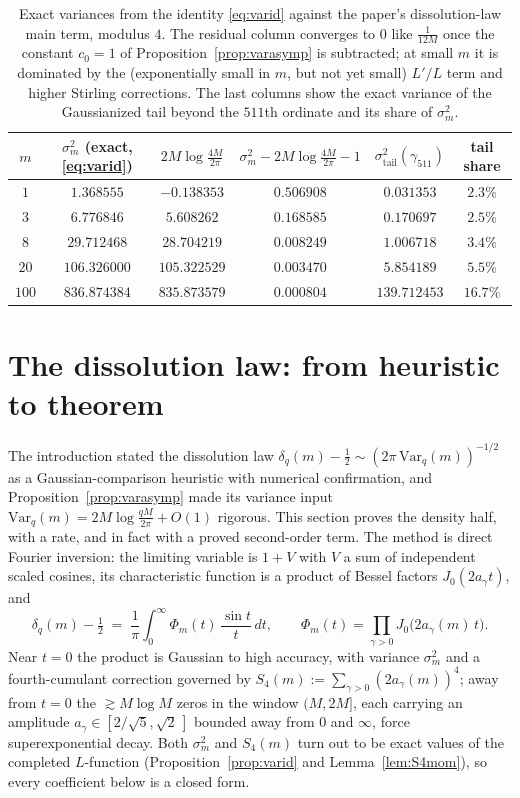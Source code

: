 \documentclass[11pt]{article}
\begin{document}
\begin{table}[h]\centering
\begin{tabular}{cccccc}
\toprule
$m$ & $\sigma_m^2$ (exact, \eqref{eq:varid}) &
$2M\log\frac{4M}{2\pi}$ &
$\sigma_m^2-2M\log\frac{4M}{2\pi}-1$ &
$\sigma^2_{\mathrm{tail}}(\gamma_{511})$ & tail share\\
\midrule
$1$   & $1.368555$   & $-0.138353$  & $0.506908$ & $0.031353$   & $2.3\%$\\
$3$   & $6.776846$   & $5.608262$   & $0.168585$ & $0.170697$   & $2.5\%$\\
$8$   & $29.712468$  & $28.704219$  & $0.008249$ & $1.006718$   & $3.4\%$\\
$20$  & $106.326000$ & $105.322529$ & $0.003470$ & $5.854189$   & $5.5\%$\\
$100$ & $836.874384$ & $835.873579$ & $0.000804$ & $139.712453$ & $16.7\%$\\
\bottomrule
\end{tabular}
\caption{Exact variances from the identity \eqref{eq:varid} against
the paper's dissolution-law main term, modulus $4$. The residual
column converges to $0$ like $\tfrac1{12M}$ once the constant $c_0=1$
of Proposition~\ref{prop:varasymp} is subtracted; at small $m$ it is
dominated by the (exponentially small in $m$, but not yet small)
$L'/L$ term and higher Stirling corrections. The last columns show the
exact variance of the Gaussianized tail beyond the $511$th ordinate
and its share of $\sigma_m^2$.}
\label{tab:varexact}
\end{table}


\section{The dissolution law: from heuristic to theorem}
\label{sec:dissolution}

The introduction stated the dissolution law
$\delta_q(m)-\tfrac12\sim(2\pi\,\mathrm{Var}_q(m))^{-1/2}$ as a
Gaussian-comparison heuristic with numerical confirmation, and
Proposition~\ref{prop:varasymp} made its variance input
$\mathrm{Var}_q(m)=2M\log\tfrac{qM}{2\pi}+O(1)$ rigorous. This section
proves the density half, with a rate, and in fact with a proved
second-order term. The method is direct Fourier inversion: the limiting
variable is $1+V$ with $V$ a sum of independent scaled cosines, its
characteristic function is a product of Bessel factors
$J_0(2a_\gamma t)$, and
\[
\delta_q(m)-\tfrac12\;=\;\frac1\pi\int_0^\infty
\Phi_m(t)\,\frac{\sin t}{t}\,dt,
\qquad
\Phi_m(t)=\prod_{\gamma>0}J_0\bigl(2a_\gamma(m)\,t\bigr).
\]
Near $t=0$ the product is Gaussian to high accuracy, with variance
$\sigma_m^2$ and a fourth-cumulant correction governed by
$S_4(m):=\sum_{\gamma>0}(2a_\gamma(m))^4$; away from $t=0$ the
$\gtrsim M\log M$ zeros in the window $(M,2M]$, each carrying an
amplitude $a_\gamma\in[2/\sqrt5,\sqrt2\,]$ bounded away from $0$ and
$\infty$, force superexponential decay. Both $\sigma_m^2$ and $S_4(m)$
turn out to be exact values of the completed $L$-function
(Proposition~\ref{prop:varid} and Lemma~\ref{lem:S4mom}), so every
coefficient below is a closed form.
\end{document}
